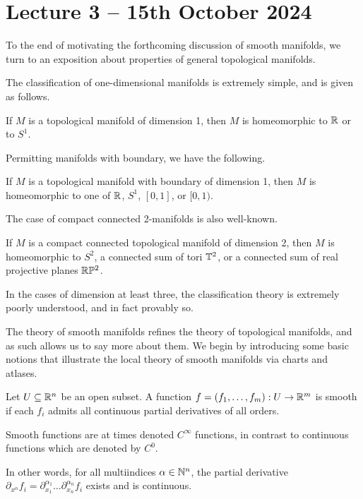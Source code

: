 \section{Lecture 3 -- 15th October 2024}\label{sec: lecture 3}
To the end of motivating the forthcoming discussion of smooth manifolds, we turn to an exposition about  properties of general topological manifolds. 

The classification of one-dimensional manifolds is extremely simple, and is given as follows. 
\begin{theorem}\label{thm: classification of 1-dim manifolds}
    If $M$ is a topological manifold of dimension 1, then $M$ is homeomorphic to $\mathbb{R}$ or to $S^{1}$. 
\end{theorem}
Permitting manifolds with boundary, we have the following. 
\begin{theorem}\label{thm: classification of 1-dim manifolds with boundary}
    If $M$ is a topological manifold with boundary of dimension 1, then $M$ is homeomorphic to one of $\mathbb{R}$, $S^{1}$, $[0,1]$, or $[0,1)$. 
\end{theorem}
The case of compact connected 2-manifolds is also well-known. 
\begin{theorem}\label{thm: classification of 2-dim manifolds}
    If $M$ is a compact connected topological manifold of dimension 2, then $M$ is homeomorphic to $S^{2}$, a connected sum of tori $\mathbb{T}^{2}$, or a connected sum of real projective planes $\mathbb{R}\mathbb{P}^{2}$. 
\end{theorem}
In the cases of dimension at least three, the classification theory is extremely poorly understood, and in fact provably so. 

The theory of smooth manifolds refines the theory of topological manifolds, and as such allows us to say more about them. We begin by introducing some basic notions that illustrate the local theory of smooth manifolds via charts and atlases. 
\begin{definition}\label{def: smooth function}
    Let $U\subseteq\mathbb{R}^{n}$ be an open subset. A function $f=(f_{1},\dots,f_{m}):U\to\mathbb{R}^{m}$ is smooth if each $f_{i}$ admits all continuous partial derivatives of all orders. 
\end{definition}
\begin{remark}
    Smooth functions are at times denoted $C^{\infty}$ functions, in contrast to continuous functions which are denoted by $C^{0}$. 
\end{remark}
In other words, for all multiindices $\alpha\in\mathbb{N}^{n}$, the partial derivative $\partial_{x^{\alpha}}f_{i}=\partial_{x_{1}}^{\alpha_{1}}\dots\partial_{x_{n}}^{\alpha_{n}}f_{i}$ exists and is continuous. 


